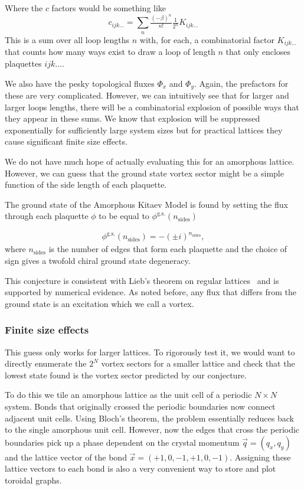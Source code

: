 Where the \(c\) factors would be something like \[c_{ijk...} = \sum_n \tfrac{(-\beta)^n}{n!} \tfrac{1}{2^n} K_{ijk...}\] This is a sum over all loop lengths \(n\) with, for each, a combinatorial factor \(K_{ijk...}\) that counts how many ways exist to draw a loop of length \(n\) that only encloses plaquettes \(ijk...\).

We also have the pesky topological fluxes \(\Phi_x\) and \(\Phi_y\). Again, the prefactors for these are very complicated. However, we can intuitively see that for larger and larger loops lengths, there will be a combinatorial explosion of possible ways that they appear in these sums. We know that explosion will be suppressed exponentially for sufficiently large system sizes but for practical lattices they cause significant finite size effects.

We do not have much hope of actually evaluating this for an amorphous lattice. However, we can guess that the ground state vortex sector might be a simple function of the side length of each plaquette.

The ground state of the Amorphous Kitaev Model is found by setting the flux through each plaquette \(\phi\) to be equal to \(\phi^{\mathrm{g.s.}}(n_{\mathrm{sides}})\)

\[\begin{aligned}
    \phi^{\mathrm{g.s.}}(n_{\mathrm{sides}}) = -(\pm i)^{n_{\mathrm{sides}}},
\end{aligned}\] where \(n_{\mathrm{sides}}\) is the number of edges that form each plaquette and the choice of sign gives a twofold chiral ground state degeneracy.

This conjecture is consistent with Lieb's theorem on regular lattices~\autocite{lieb_flux_1994} and is supported by numerical evidence. As noted before, any flux that differs from the ground state is an excitation which we call a vortex.

\hypertarget{finite-size-effects}{%
\subsubsection{Finite size effects}\label{finite-size-effects}}

This guess only works for larger lattices. To rigorously test it, we would want to directly enumerate the \(2^N\) vortex sectors for a smaller lattice and check that the lowest state found is the vortex sector predicted by our conjecture.

To do this we tile an amorphous lattice as the unit cell of a periodic \(N\times N\) system. Bonds that originally crossed the periodic boundaries now connect adjacent unit cells. Using Bloch's theorem, the problem essentially reduces back to the single amorphous unit cell. However, now the edges that cross the periodic boundaries pick up a phase dependent on the crystal momentum \(\vec{q} = (q_x, q_y)\) and the lattice vector of the bond \(\vec{x} = (+1, 0, -1, +1, 0, -1)\). Assigning these lattice vectors to each bond is also a very convenient way to store and plot toroidal graphs.


